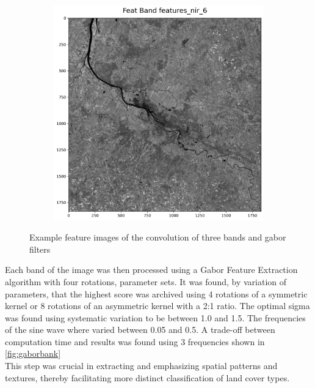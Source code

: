 \documentclass[12pt,a4paper, english,twoside]{article}
\begin{document}
\begin{figure}[!htbp]
\begin{subfigure}[b]{0.3\textwidth}
        \end{subfigure}
        \begin{subfigure}[b]{0.3\textwidth}
          \includegraphics[width=\textwidth]{img/Features_nir_6.png}
        \end{subfigure}
       \caption{Example feature images of the convolution of three bands and gabor filters\label{fig:gaborresults}}
      \end{figure}
      \noindent 
      Each band of the image was then processed using a Gabor Feature Extraction algorithm with four rotations, parameter sets. 
      It was found, by variation of parameters, that the highest score was archived using 4 rotations of a symmetric kernel or 8 rotations of an asymmetric kernel with a 2:1 ratio.
      The optimal sigma was found using systematic variation to be between 1.0 and 1.5. 
      The frequencies of the sine wave where varied between 0.05 and 0.5. A trade-off between computation time and results was found using 3 frequencies shown in \cref{fig:gaborbank} \\ 
      This step was crucial in extracting and emphasizing spatial patterns and textures, thereby facilitating more distinct classification of land cover types. 
\end{document}
